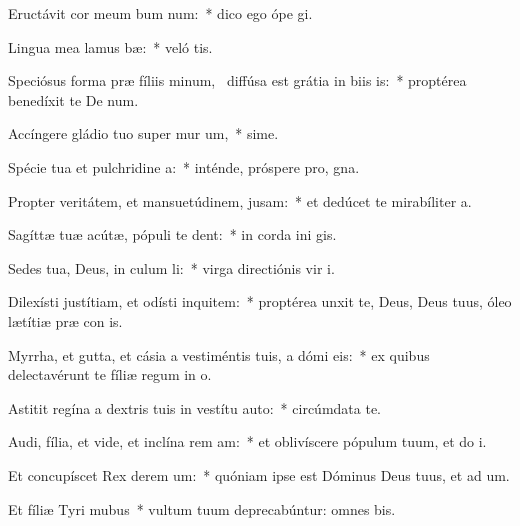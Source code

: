 \item Eructávit cor meum bum num:~* dico ego ópe  gi.
\item Lingua mea lamus bæ:~* veló tis.
\item Speciósus forma præ fíliis minum,~\pscross{} diffúsa est grátia in biis is:~* proptérea benedíxit te De  num.
\item Accíngere gládio tuo super mur um,~* sime.
\item Spécie tua et pulchridine a:~* inténde, próspere pro,  gna.
\item Propter veritátem, et mansuetúdinem,  jusam:~* et dedúcet te mirabíliter  a.
\item Sagíttæ tuæ acútæ, pópuli  te dent:~* in corda ini gis.
\item Sedes tua, Deus, in culum li:~* virga directiónis vir  i.
\item Dilexísti justítiam, et odísti inquitem:~* proptérea unxit te, Deus, Deus tuus, óleo lætítiæ præ con is.
\item Myrrha, et gutta, et cásia a vestiméntis tuis, a dómi eis:~* ex quibus delectavérunt te fíliæ regum in  o.
\item Astitit regína a dextris tuis in vestítu auto:~* circúmdata te.
\item Audi, fília, et vide, et inclína rem am:~* et oblivíscere pópulum tuum, et do  i.
\item Et concupíscet Rex derem um:~* quóniam ipse est Dóminus Deus tuus, et ad um.
\item Et fíliæ Tyri  mubus~* vultum tuum deprecabúntur: omnes  bis.
